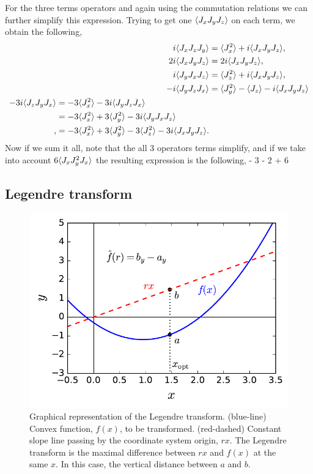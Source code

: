 For the three terms operators and again using the commutation relations we can further simplify this expression. Trying to get one $\langle J_xJ_yJ_z \rangle$ on each term, we obtain the following,
\begin{subequations}
\begin{align}
  i\langle J_xJ_zJ_y \rangle & = \langle J_x^2 \rangle+i\langle J_xJ_yJ_z \rangle,
  \label{eq:ap-last-terms-1} \\
  2i\langle J_xJ_yJ_z \rangle & = 2i\langle J_xJ_yJ_z \rangle,
  \label{eq:ap-last-term-2} \\
  i\langle J_yJ_xJ_z \rangle & = \langle J_z^2 \rangle+i\langle J_xJ_yJ_z \rangle,
  \label{eq:ap-simplification-3} \\
  -i\langle J_yJ_zJ_x \rangle & = \langle J_y^2 \rangle - \langle J_z \rangle - i\langle J_xJ_yJ_z \rangle \\
\begin{split}
  -3i\langle J_zJ_yJ_x \rangle & = -3\langle J_x^2 \rangle - 3i \langle J_yJ_zJ_x \rangle \\
  & = -3\langle J_x^2 \rangle + 3 \langle J_y^2 \rangle - 3i\langle J_yJ_xJ_z \rangle \\,
  & = -3\langle J_x^2 \rangle + 3 \langle J_y^2 \rangle - 3\langle J_z^2 \rangle
   - 3i \langle J_xJ_yJ_z \rangle.
  \label{eq:ap-simplification-4}
\end{split}
\end{align}
\end{subequations}
Now if we sum it all, note that the all 3 operators terms simplify, and if we take into account $6\langle J_xJ_y^2J_x \rangle$ the resulting expression is the following,
 - 3  - 2 + 6
\ee

\subsection{Legendre transform}

\begin{figure}
  \centering
  \includegraphics[scale=.65]{img/plots/LT_legendre.pdf}
  \caption{Graphical representation of the Legendre transform. (blue-line) Convex function, $f(x)$, to be transformed. (red-dashed) Constant slope line passing by the coordinate system origin, $rx$. The Legendre transform is the maximal difference between $rx$ and $f(x)$ at the same $x$. In this case, the vertical distance between $a$ and $b$.}
  \label{fig:vd-secuence-evo}
\end{figure}

